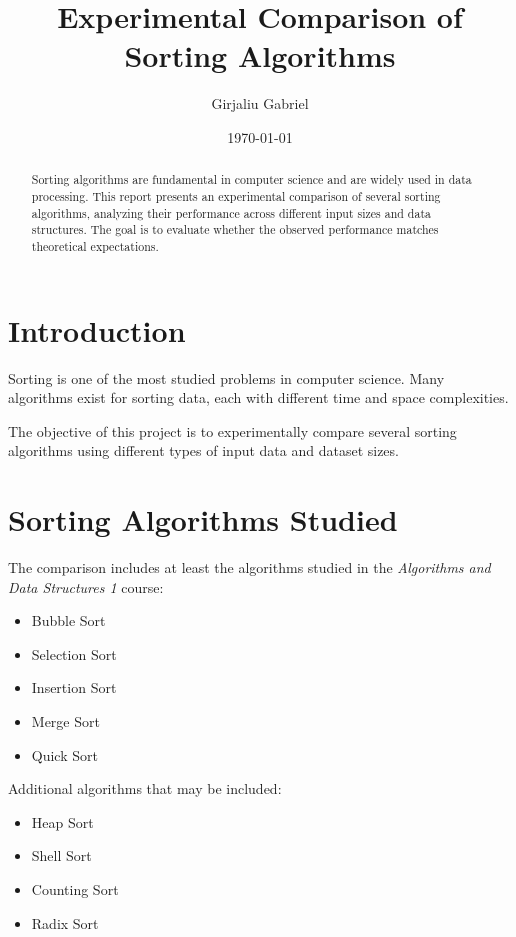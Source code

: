 \documentclass[12pt]{article}
\title{Experimental Comparison of Sorting Algorithms}
\author{Girjaliu Gabriel}
\date{\today}
\begin{document}
\maketitle

\begin{abstract}
Sorting algorithms are fundamental in computer science and are widely used in data processing. 
This report presents an experimental comparison of several sorting algorithms, analyzing their 
performance across different input sizes and data structures. The goal is to evaluate whether 
the observed performance matches theoretical expectations.
\end{abstract}

\section{Introduction}

Sorting is one of the most studied problems in computer science. Many algorithms exist for 
sorting data, each with different time and space complexities.

The objective of this project is to experimentally compare several sorting algorithms using 
different types of input data and dataset sizes.

\section{Sorting Algorithms Studied}

The comparison includes at least the algorithms studied in the \textit{Algorithms and Data Structures 1} course:

\begin{itemize}
\item Bubble Sort
\item Selection Sort
\item Insertion Sort
\item Merge Sort
\item Quick Sort
\end{itemize}

Additional algorithms that may be included:

\begin{itemize}
\item Heap Sort
\item Shell Sort
\item Counting Sort
\item Radix Sort
\end{itemize}
\end{document}
